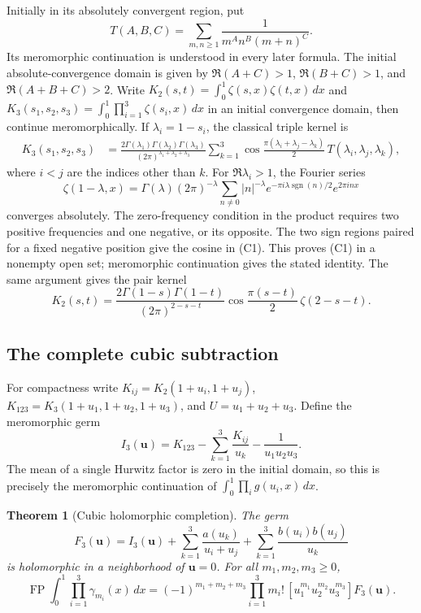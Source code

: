 \documentclass[11pt,letterpaper]{article}
\numberwithin{equation}{section}
\newtheorem{theorem}{Theorem}[section]
\theoremstyle{definition}
\theoremstyle{remark}
\begin{document}
Initially in its absolutely convergent region, put
\[
 T(A,B,C)=\sum_{m,n\ge1}\frac1{m^A n^B(m+n)^C}.
\]
Its meromorphic continuation is understood in every later formula.
The initial absolute-convergence domain is given by
$\Re(A+C)>1$, $\Re(B+C)>1$, and $\Re(A+B+C)>2$.
Write $K_2(s,t)=\int_0^1\zeta(s,x)\zeta(t,x)\,dx$ and
$K_3(s_1,s_2,s_3)=\int_0^1\prod_{i=1}^3\zeta(s_i,x)\,dx$ in an
initial convergence domain, then continue meromorphically.
If $\lambda_i=1-s_i$, the classical triple kernel is
\begin{align}
 K_3(s_1,s_2,s_3)
 &=\frac{2\Gamma(\lambda_1)\Gamma(\lambda_2)\Gamma(\lambda_3)}
          {(2\pi)^{\lambda_1+\lambda_2+\lambda_3}}
 \sum_{k=1}^3
 \cos\frac{\pi(\lambda_i+\lambda_j-\lambda_k)}2\,
 T(\lambda_i,\lambda_j,\lambda_k),             \tag{C1}\label{cub:C1}
\end{align}
where $i<j$ are the indices other than $k$.
For $\Re\lambda_i>1$, the Fourier series
\[
 \zeta(1-\lambda,x)=\Gamma(\lambda)(2\pi)^{-\lambda}
 \sum_{n\ne0}|n|^{-\lambda}
       e^{-\pi i\lambda\operatorname{sgn}(n)/2}e^{2\pi inx}
\]
converges absolutely.  The zero-frequency condition in the product
requires two positive frequencies and one negative, or its opposite.
The two sign regions paired for a fixed negative position give the
cosine in (C1). This proves (C1) in a nonempty open set; meromorphic
continuation gives the stated identity. The same argument gives the pair kernel
\[
K_2(s,t)=\frac{2\Gamma(1-s)\Gamma(1-t)}{(2\pi)^{2-s-t}}
\cos\frac{\pi(s-t)}2\,\zeta(2-s-t).
\]

\subsection{The complete cubic subtraction}

For compactness write $K_{ij}=K_2(1+u_i,1+u_j)$,
$K_{123}=K_3(1+u_1,1+u_2,1+u_3)$, and $U=u_1+u_2+u_3$.
Define the meromorphic germ
\[
 I_3(\boldsymbol u)=K_{123}-\sum_{k=1}^3\frac{K_{ij}}{u_k}
                    -\frac1{u_1u_2u_3}.        \tag{C2}\label{cub:C2}
\]
The mean of a single Hurwitz factor is zero in the initial domain, so
this is precisely the meromorphic continuation of
$\int_0^1\prod_i g(u_i,x)\,dx$.

\begin{theorem}[Cubic holomorphic completion]
The germ
\[
 F_3(\boldsymbol u)=I_3(\boldsymbol u)
   +\sum_{k=1}^3\frac{a(u_k)}{u_i+u_j}
   +\sum_{k=1}^3\frac{b(u_i)b(u_j)}{u_k}       \tag{C3}\label{cub:C3}
\]
is holomorphic in a neighborhood of $\boldsymbol u=0$. For all
$m_1,m_2,m_3\ge0$,
\[
 \operatorname{FP}\int_0^1\prod_{i=1}^3\gamma_{m_i}(x)\,dx
 =(-1)^{m_1+m_2+m_3}\prod_{i=1}^3m_i!\,
   [u_1^{m_1}u_2^{m_2}u_3^{m_3}]F_3(\boldsymbol u). \tag{C4}\label{cub:C4}
\]
\end{theorem}
\end{document}
